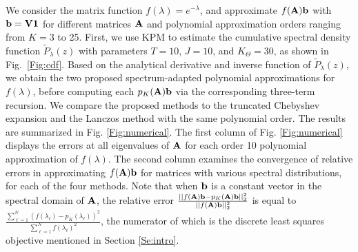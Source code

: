 \documentclass{article}
\begin{document}
We consider the matrix function $f(\lambda)=e^{-\lambda}$, and approximate $f(\bf A){\bf b}$ with ${\bf b}={\bf V1}$ for different matrices ${\bf A}$ and polynomial approximation orders ranging from $K=3$ to 25. %
First, we use KPM to estimate the cumulative spectral density function $\tilde{P}_{\lambda}(z)$ with parameters $T=10$,  $J=10$, and $K_{\Theta}=30$, as shown in Fig.\ \ref{Fig:cdf}. Based on the analytical derivative and inverse function of $\tilde{P}_{\lambda}(z)$, we obtain the two proposed spectrum-adapted polynomial approximations for $f(\lambda)$, before computing each $p_K(\bf A){\bf b}$ via the corresponding three-term recursion.
We compare the proposed methods to the truncated Chebyshev expansion and the Lanczos method with the same polynomial order. The results are summarized in Fig. \ref{Fig:numerical}. %
The first column of Fig. \ref{Fig:numerical} displays the %
 errors at all eigenvalues of $\bf A$ for each order 10 polynomial approximation of $f(\lambda)$. The second column examines the convergence of relative errors in approximating $f({\bf A}){\bf b}$ for matrices with various spectral distributions, for each of the four methods. Note that when ${\bf b}$ is a constant vector in the spectral domain of ${\bf A}$, the relative error $\frac{||f({\bf A}){\bf b}-p_K({\bf A}){\bf b}||_2^2}{||f({\bf A}){\bf b}||_2^2}$ is equal to $\frac{\sum_{\ell=1}^N \left(f(\lambda_{\ell})-p_K(\lambda_{\ell})\right)^2}{\sum_{\ell=1}^N f(\lambda_{\ell})^2}$, the numerator of which is the discrete least squares objective mentioned in Section \ref{Se:intro}.
\end{document}
